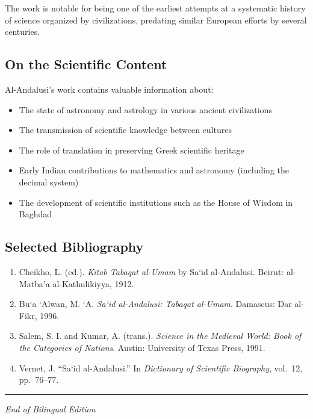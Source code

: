 \documentclass[11pt,a4paper]{article}
\newcommand{\shortline}{\noindent\rule{0.5\textwidth}{0.4pt}\par}
\begin{document}
The work is notable for being one of the earliest attempts at a systematic history of science organized by civilizations, predating similar European efforts by several centuries.

\subsection*{On the Scientific Content}

Al-Andalusi's work contains valuable information about:

\begin{itemize}
  \item The state of astronomy and astrology in various ancient civilizations
  \item The transmission of scientific knowledge between cultures
  \item The role of translation in preserving Greek scientific heritage
  \item Early Indian contributions to mathematics and astronomy (including the decimal system)
  \item The development of scientific institutions such as the House of Wisdom in Baghdad
\end{itemize}

\subsection*{Selected Bibliography}

\begin{enumerate}
  \item Cheikho, L. (ed.). \textit{Kitab Tabaqat al-Umam} by Sa\textquoteleft id al-Andalusi. Beirut: al-Matba'a al-Kathulikiyya, 1912.
  \item Bu\textquoteleft a \textquoteleft Alwan, M. \textquoteleft A. \textit{Sa\textquoteleft id al-Andalusi: Tabaqat al-Umam}. Damascus: Dar al-Fikr, 1996.
  \item Salem, S. I. and Kumar, A. (trans.). \textit{Science in the Medieval World: Book of the Categories of Nations}. Austin: University of Texas Press, 1991.
  \item Vernet, J. ``Sa\textquoteleft id al-Andalusi.'' In \textit{Dictionary of Scientific Biography}, vol.~12, pp.~76--77.
\end{enumerate}

\vspace{1cm}
\begin{center}
\shortline
\vspace{0.5cm}
{\small\textit{End of Bilingual Edition}}
\end{center}
\end{document}
